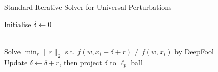 \documentclass[12pt]{article}
\begin{document}
\begin{algorithm}
\caption{Standard Iterative Solver for Universal Perturbations}\label{Alg_1}
\begin{algorithmic}[1]
\State Initialise $\delta \gets 0$



 \\ 
\hspace{\algorithmicindent} Solve $\min_r \|r\|_2$ s.t.  $f(w,x_i+\delta+r) \neq f(w,x_i)$ by DeepFool \\
\hspace{\algorithmicindent} Update $\delta \gets \delta + r$, then project $\delta$ to $\ell_p$ ball
\EndIf
\EndFor
\EndWhile



\end{algorithmic}
\end{algorithm}
\end{document}

